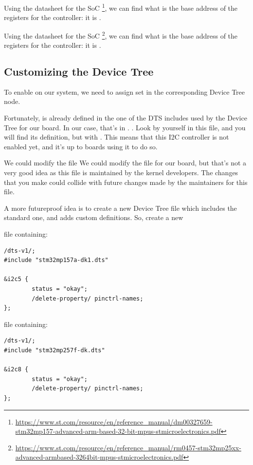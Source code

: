 \if{}
Using the datasheet for the SoC
\footnote{\url{https://www.st.com/resource/en/reference_manual/dm00327659-stm32mp157-advanced-arm-based-32-bit-mpus-stmicroelectronics.pdf}},
we can find what is the base address of the registers for the
 controller: it is .
\fi

\if{}
Using the datasheet for the SoC
\footnote{\url{https://www.st.com/resource/en/reference_manual/rm0457-stm32mp25xx-advanced-armbased-3264bit-mpus-stmicroelectronics.pdf}},
we can find what is the base address of the registers for the
 controller: it is .
\fi

\subsection{Customizing the Device Tree}

To enable \busname on our system, we need to assign set  in the corresponding Device Tree node.

Fortunately, \busname is already defined in the one of the DTS includes
used by the Device Tree for our board. In our case, that's in
\if{}
.
\fi
\if{}
.
\fi
Look by yourself in this
file, and you will find its definition, but with . This means that this I2C controller is not enabled yet,
and it's up to boards using it to do so.

\if{}
We could modify the  file
\fi
\if{}
We could modify the  file
\fi
for our board, but that's not a very good idea as this file is
maintained by the kernel developers. The changes that you make could
collide with future changes made by the maintainers for this file.

A more futureproof idea is to create a new Device Tree file which
includes the standard one, and adds custom definitions. So, create a
new

\if{}
 file containing:
\begin{verbatim}
/dts-v1/;
#include "stm32mp157a-dk1.dts"

&i2c5 {
        status = "okay";
        /delete-property/ pinctrl-names;
};
\end{verbatim}
\fi
\if{}
 file containing:
\begin{verbatim}
/dts-v1/;
#include "stm32mp257f-dk.dts"

&i2c8 {
        status = "okay";
        /delete-property/ pinctrl-names;
};
\end{verbatim}
\fi

